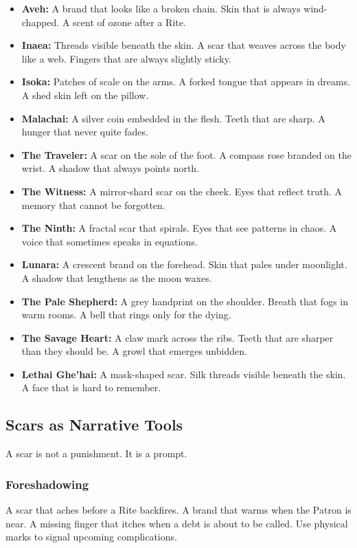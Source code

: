 \begin{itemize}
\item \textbf{Aveh:} A brand that looks like a broken chain. Skin that is always wind-chapped. A scent of ozone after a Rite.
\item \textbf{Inaea:} Threads visible beneath the skin. A scar that weaves across the body like a web. Fingers that are always slightly sticky.
\item \textbf{Isoka:} Patches of scale on the arms. A forked tongue that appears in dreams. A shed skin left on the pillow.
\item \textbf{Malachai:} A silver coin embedded in the flesh. Teeth that are sharp. A hunger that never quite fades.
\item \textbf{The Traveler:} A scar on the sole of the foot. A compass rose branded on the wrist. A shadow that always points north.
\item \textbf{The Witness:} A mirror-shard scar on the cheek. Eyes that reflect truth. A memory that cannot be forgotten.
\item \textbf{The Ninth:} A fractal scar that spirals. Eyes that see patterns in chaos. A voice that sometimes speaks in equations.
\item \textbf{Lunara:} A crescent brand on the forehead. Skin that pales under moonlight. A shadow that lengthens as the moon waxes.
\item \textbf{The Pale Shepherd:} A grey handprint on the shoulder. Breath that fogs in warm rooms. A bell that rings only for the dying.
\item \textbf{The Savage Heart:} A claw mark across the ribs. Teeth that are sharper than they should be. A growl that emerges unbidden.
\item \textbf{Lethai Ghe'hai:} A mask-shaped scar. Silk threads visible beneath the skin. A face that is hard to remember.
\end{itemize}

\subsection{Scars as Narrative Tools}

A scar is not a punishment. It is a prompt.

\subsubsection{Foreshadowing}

A scar that aches before a Rite backfires. A brand that warms when the Patron is near. A missing finger that itches when a debt is about to be called. Use physical marks to signal upcoming complications.

